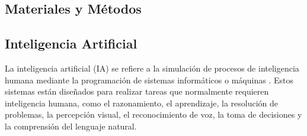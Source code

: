 \documentclass[12pt,twoside,titlepage]{ingenius}
\begin{document}
\begin{multicols}{2}
%
%
%
%
%

\section{Materiales y Métodos}

\subsection{Inteligencia Artificial}
La inteligencia artificial (IA) se refiere a la simulación de procesos de inteligencia humana mediante la programación de sistemas informáticos o máquinas \cite{5}. Estos sistemas están diseñados para realizar tareas que normalmente requieren inteligencia humana, como el razonamiento, el aprendizaje, la resolución de problemas, la percepción visual, el reconocimiento de voz, la toma de decisiones y la comprensión del lenguaje natural.\\


\end{multicols}
\end{document}
